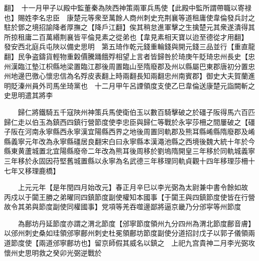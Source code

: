 翻】　十一月甲子以殿中監董秦為陜西神策兩軍兵馬使【此殿中監所謂帶職以寄禄也】賜姓李名忠臣　康楚元等衆至萬餘人商州刺史充荆襄等道租庸使韋倫發兵討之駐於鄧之境招諭降者厚撫之【降戶江翻】俟其稍怠進軍擊之生擒楚元其衆遂潰得其所掠租庸二百萬緡荆襄皆平倫見素之從弟也【韋見素相天寶以迨至德從才用翻】　發安西北庭兵屯陜以備史思明　第五琦作乾元錢重輪錢與開元錢三品並行【重直龍翻】民争盗鑄貨輕物重糓價騰踊餓殍相望上言者皆歸咎於琦庚午貶琦忠州長史【忠州漢臨江墊江枳縣地梁置臨江郡後周置臨山至隋廢郡及州以縣屬巴東郡唐初分置忠州地邊巴徼心懷忠信為名殍皮表翻上時兩翻長知兩翻忠州南賓郡】御史大夫賀蘭進明貶溱州員外司馬坐琦黨也　十二月甲午呂諲領度支使乙巳韋倫送康楚元詣闕斬之　史思明遣其將李

　　歸仁將鐵騎五千寇陜州神策兵馬使衛伯玉以數百騎擊破之於礓子阪得馬六百匹歸仁走以伯玉為鎮西四鎮行營節度使李忠臣與歸仁等戰於永寜莎柵之間屢破之【礓子阪在河南永寧縣西永寧漢宜陽縣西界之地後周置同軌郡及熊耳縣崤縣隋廢郡及崤縣義寧元年改為永寧縣礓居良翻宋白曰永寧縣本漢澠池縣之西境後魏大統十年於今縣東黄蘆城置北宜陽縣廢帝二年改為熊耳後周移於劉塢隋開皇三年移於同軌城義寧三年移於永固因苻堅舊城置縣以永寧為名武德三年移理同軌貞觀十四年移理莎柵十七年又移理鹿橋】

　　上元元年【是年閏四月始改元】春正月辛巳以李光弼為太尉兼中書令餘如故　丙戍以于闐王勝之弟曜同四鎮節度副使權知本國事【于闐王與四鎮節度使皆在行營故令其弟與節度副使同權國事】党項等羌吞噬邊鄙將逼京畿乃分邠寜等州節度

　　為鄜坊丹延節度亦謂之渭北節度【邠寧節度領州九分四州為渭北節度鄜音膚】以邠州刺史桑如珪領邠寧鄜州刺史杜冕領鄜坊節度副使分道招討戊子以郭子儀領兩道節度使【兩道邠寧鄜坊也】留京師假其威名以鎮之　上祀九宫貴神二月李光弼攻懷州史思明救之癸卯光弼逆戰於

